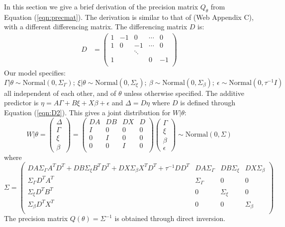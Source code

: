 \documentclass[num-refs,serif,10pt]{wiley-article}
\begin{document}
In this section we give a brief derivation of the precision matrix $Q_{\theta}$ from Equation (\ref{eqn:precmat}). The derivation is similar to that of \cite{casecross} (Web Appendix C), with a different differencing matrix. The differencing matrix $D$ is:
\begin{equation}\begin{aligned}\label{eqn:D2}
D &= \begin{pmatrix}
1 & -1 & 0 & \cdots & 0 \\
1 & 0 & -1 & \cdots & 0 \\
  &    & \ddots &   &   \\
1 &    &       & 0 & -1 \\
\end{pmatrix}
\end{aligned}\end{equation}
Our model specifies:
\begin{equation*}
\Gamma|\theta \sim \text{Normal}\left( 0,\Sigma_{\Gamma}\right); \ \xi|\theta \sim \text{Normal}\left( 0,\Sigma_{\xi}\right); \ \beta \sim \text{Normal}\left( 0,\Sigma_{\beta}\right); \ \epsilon \sim \text{Normal}\left( 0,\tau^{-1}I\right)
\end{equation*}
all independent of each other, and of $\theta$ unless otherwise specified. The additive predictor is $\eta = A\Gamma + B\xi + X\beta + \epsilon$ and $\Delta = D\eta$ where $D$ is defined through Equation (\ref{eqn:D2}). This gives a joint distribution for $W|\theta$:
\begin{equation*}
W|\theta = \begin{pmatrix} \Delta \\ \Gamma \\ \xi \\\beta \end{pmatrix} = \begin{pmatrix} DA & DB & DX & D \\ I & 0 & 0 & 0 \\ 0 & I & 0 & 0 \\ 0 & 0 & I & 0 \\ \end{pmatrix}\begin{pmatrix}\Gamma\\ \xi \\ \beta \\ \epsilon \end{pmatrix} 
\sim \text{Normal}\left( 0,\Sigma\right)
\end{equation*}
where
\begin{equation*}
\Sigma = \begin{pmatrix}
DA\Sigma_{\Gamma}A^{T}D^{T} + DB\Sigma_{\xi}B^{T}D^{T} + DX\Sigma_{\beta}X^{T}D^{T} + \tau^{-1}DD^{T} & DA\Sigma_{\Gamma} & DB\Sigma_{\xi} & DX\Sigma_{\beta} \\
\Sigma_{\Gamma}D^{T}A^{T} & \Sigma_{\Gamma} & 0 & 0 \\
\Sigma_{\xi}D^{T}B^{T} & 0 & \Sigma_{\xi} & 0 \\
\Sigma_{\beta}D^{T}X^{T} & 0 & 0 & \Sigma_{\beta} \\
\end{pmatrix}
\end{equation*}
The precision matrix $Q(\theta) = \Sigma^{-1}$ is obtained through direct inversion.


\nocite{*}%
%


\clearpage
\end{document}
